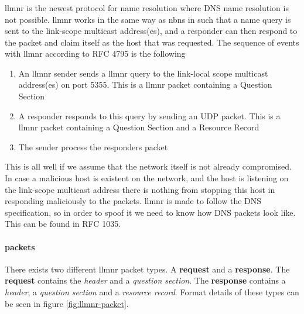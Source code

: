 \documentclass{article}
\begin{document}
\subsubsection{}
\label{sec:llmnr}
\gls{llmnr} is the newest protocol for name resolution where DNS name resolution is not possible\cite{url:rfc:llmnr}. \gls{llmnr} works in the same way as \gls{nbns} in such that a name query is sent to the link-scope multicast address(es), and a responder can then respond to the packet and claim itself as the host that was requested. The sequence of events with \gls{llmnr} according to RFC 4795\cite{url:rfc:llmnr} is the following
\begin{enumerate}
	\item An \gls{llmnr} sender sends a \gls{llmnr} query to the link-local scope multicast address(es) on port 5355. This is a \gls{llmnr} packet containing a Question Section
	\item A responder responds to this query by sending an UDP packet. This is a \gls{llmnr} packet containing a Question Section and a Resource Record
	\item The sender process the responders packet
\end{enumerate}

This is all well if we assume that the network itself is not already compromised. In case a malicious host is existent on the network, and the host is listening on the link-scope multicast address there is nothing from stopping this host in responding maliciously to the packets. \gls{llmnr} is made to follow the DNS specification, so in order to spoof it we need to know how DNS packets look like. This can be found in RFC 1035\cite{url:rfc:dns}.

\paragraph{ packets}

There exists two different \gls{llmnr} packet types. A \textbf{request} and a \textbf{response}. The \textbf{request} contains the \emph{header} and a \emph{question section}. The \textbf{response} contains a \emph{header}, a \emph{question section} and a \emph{resource record}. Format details of these types can be seen in figure \ref{fig:llmnr-packet}.
\end{document}
